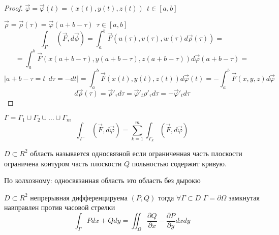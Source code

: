 \begin{proof}
  $\vec \varphi = \vec \varphi(t) = (x(t), y(t), z(t)) ~~ t \in [a,b]$

  $\vec \rho = \vec \rho (\tau) = \vec \varphi(a+b-\tau) ~~ \tau \in [a,b]$
  $$
  \int_{\Gamma^-}(\vec F, d\vec \phi) = \int_a^b \vec F(u(\tau), v(\tau),
  w(\tau)d\vec \rho (\tau)) =
  $$
  $$
  = \int_a^b \vec F(x(a+b-\tau),y(a+b-\tau),z(a+b-\tau))d\vec \varphi(a+b-\tau)
  =
  $$
  $$
  |a+b -\tau = t ~~ d\tau = -dt|
  = \int_a^b \vec F(x(t), y(t), z(t))d\vec \varphi(t) =
  - \int_a^b \vec F(x,y,z)d\vec\varphi
  $$
  $$
  d\vec \rho(\tau) = \vec \rho'_{\tau} d\tau = \vec \varphi'_t \rho'_{\tau}
  d\tau = -\vec \varphi'_t d\tau
  $$
\end{proof}

\begin{theorem}
  $\Gamma = \Gamma_1 \cup \Gamma_2 \cup \ldots \cup \Gamma_m$
  $$
  \int_{\Gamma^-} (\vec F, d\vec \varphi) = \sum_{k=1}^m \int_{\Gamma_k}
  (\vec F, d\vec \varphi)
  $$
\end{theorem}

\begin{define}
  $D \subset R^2$ область называется односвязной если ограниченная часть
  плоскости ограничена контуром часть плоскости $Q$ польностью содержит кривую.

  По колхозному: односвязанная область это область без дырокю
\end{define}

\begin{block}
  $D \subset R^2$ непрерывная дифференцируема $(P,Q)$ тогда $\forall \Gamma
  \subset D$ $\Gamma = \partial \Omega$ замкнутая навправлен против часовой
  стрелки
  $$
  \int_{\Gamma} Pdx + Qdy = \iint_{\Omega} \frac{\partial Q}{\partial x} -
  \frac{\partial P}{\partial y} dxdy
  $$
\end{block}
